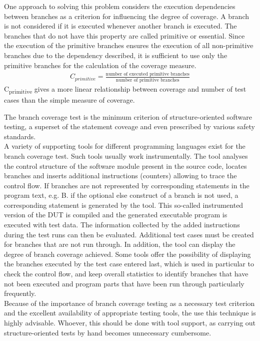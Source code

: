 \documentclass[master,english,smartquotes,apa]{hgbthesis}
\newcommand{\GREY}[1]{\textcolor{gray}{#1}}
\begin{document}
	One approach to solving this problem considers the execution dependencies between branches as a criterion for influencing the degree of coverage. A branch is not considered if it is executed whenever another branch is executed. The branches that do not have this property are called primitive or essential. Since the execution of the primitive branches ensures the execution of all non-primitive branches due to the dependency described, it is sufficient to use only the primitive branches for the calculation of the coverage measure.
	\begin{align*}
		C_{primitive} = \frac{\textrm{number of executed primitive branches}}{\textrm{number of primitive branches}}
	\end{align*}
	C\textsubscript{primitive} gives a more linear relationship between coverage and number of test cases than the simple measure of coverage. 

	The branch coverage test is the minimum criterion of structure-oriented software testing, a superset of the statement coveage and even prescribed by various safety standards. \\
	A variety of supporting tools for different programming languages exist for the branch coverage test. Such tools usually work instrumentally. The tool analyses the control structure of the software module present in the source code, locates branches and inserts additional instructions (counters) allowing to trace the control flow. If branches are not represented by corresponding statements in the program text, e.g. B. if the optional else construct of a branch is not used, a corresponding statement is generated by the tool. This so-called instrumented version of the DUT is compiled and the generated executable program is executed with test data. The information collected by the added instructions during the test runs can then be evaluated. Additional test cases must be created for branches that are not run through. In addition, the tool can display the degree of branch coverage achieved. Some tools offer the possibility of displaying the branches executed by the test case entered last, which is used in particular to check the control flow, and keep overall statistics to identify branches that have not been executed and program parts that have been run through particularly frequently. \\
	Because of the importance of branch coverage testing as a necessary test criterion and the excellent availability of appropriate testing tools, the use this technique is highly advisable. Whoever, this should be done with tool support, as carrying out structure-oriented tests by hand becomes unnecessary cumbersome.
\end{document}
